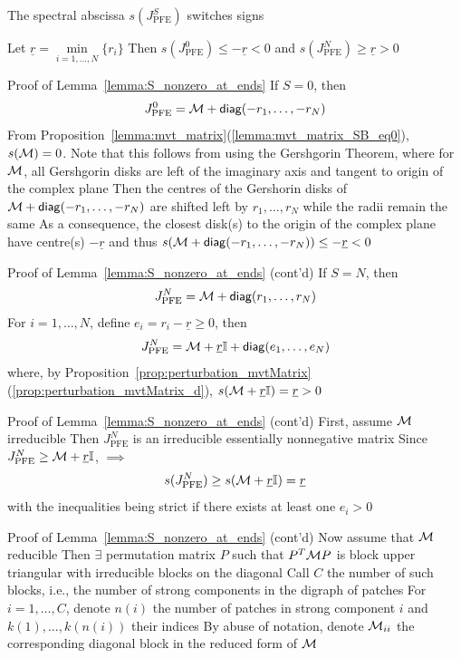 \documentclass[aspectratio=169]{beamer}
\begin{document}
\begin{frame}{The spectral abscissa $s(J_{\textrm{PFE}}^S)$ switches signs}
	\begin{lemma}\label{lemma:S_nonzero_at_ends}
		Let $\underline{r}=\min\limits_{i=1,\ldots, N} \{r_i\}$
		\vskip0.5cm
		Then $s(J_{\textrm{PFE}}^0) \leq -\underline{r} <0$ and  $s(J_{\textrm{PFE}}^N)\geq \underline{r} >0$
	\end{lemma}
\end{frame}

\begin{frame}{Proof of Lemma~\ref{lemma:S_nonzero_at_ends}}
	If $S=0$, then
	\[
	J_{\textrm{PFE}}^0=\mathcal{M}+\mathsf{diag} (-r_1,\ldots,-r_N)
	\]
	\vfill
	From Proposition~\ref{lemma:mvt_matrix}(\ref{lemma:mvt_matrix_SB_eq0}), $s(\mathcal{M}) = 0$. 
	Note that this follows from using the Gershgorin Theorem, where for $\mathcal{M}$, all Gershgorin disks are left of the imaginary axis and tangent to origin of the complex plane
	\vfill
	Then the centres of the Gershorin disks of $\mathcal{M}+\mathsf{diag} (-r_1,\ldots,-r_N)$ are shifted left by $r_1,\ldots,r_N$ while the radii remain the same
	\vfill
	As a consequence, the closest disk(s) to the origin of the complex plane have centre(s) $-\underline{r}$ and thus $s(\mathcal{M}+\mathsf{diag} (-r_1,\ldots,-r_N))\leq-\underline{r}<0$
\end{frame}

\begin{frame}{Proof of Lemma~\ref{lemma:S_nonzero_at_ends} (cont'd)}
	If $S=N$, then
	\[
	J_{\textrm{PFE}}^N=\mathcal{M}+\mathsf{diag} (r_1,\ldots,r_N)
	\]
	\vfill
	For $i=1,\ldots,N$, define $e_i=r_i-\underline{r}\geq 0$, then
	\[
	J_{\textrm{PFE}}^N=\mathcal{M}+\underline{r}\mathbb{I}+\mathsf{diag} (e_1,\ldots,e_N)
	\]
	where, by Proposition~\ref{prop:perturbation_mvtMatrix}(\ref{prop:perturbation_mvtMatrix_d}), $s(\mathcal{M}+\underline{r}\mathbb{I})=\underline{r}>0$
\end{frame}

\begin{frame}{Proof of Lemma~\ref{lemma:S_nonzero_at_ends} (cont'd)}
	First, assume $\mathcal{M}$ irreducible
	\vfill
	Then $J_{\textrm{PFE}}^N$ is an irreducible essentially nonnegative matrix
	\vfill
	Since $J_{\textrm{PFE}}^N\geq \mathcal{M}+\underline{r}\mathbb{I}$, \cite[Corollary 4.3.2(3)]{Smith1995} $\implies$
	\[
		s(J_{\textrm{PFE}}^N)\geq s(\mathcal{M}+\underline{r}\mathbb{I})=\underline{r}
	\]
	with the inequalities being strict if there exists at least one $e_i>0$
\end{frame}

\begin{frame}{Proof of Lemma~\ref{lemma:S_nonzero_at_ends} (cont'd)}
	Now assume that $\mathcal{M}$ reducible
	\vfill
	Then $\exists$ permutation matrix $P$ such that $P^T\mathcal{M} P$ is block upper triangular with irreducible blocks on the diagonal
	\vfill
	Call $C$ the number of such blocks, i.e., the number of strong components in the digraph of patches
	\vfill
	For $i=1,\ldots,C$, denote $n(i)$ the number of patches in strong component $i$ and $k(1),\ldots,k(n(i))$ their indices
	\vfill
	By abuse of notation, denote $\mathcal{M}_{ii}$ the corresponding diagonal block in the reduced form of $\mathcal{M}$
\end{frame}
\end{document}
